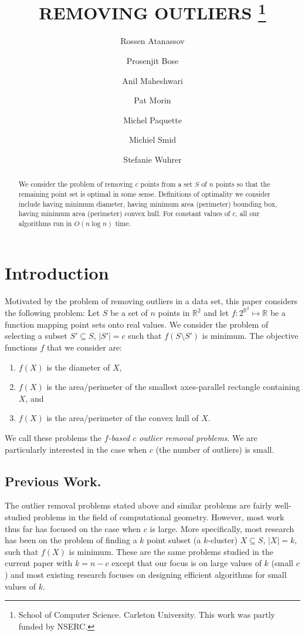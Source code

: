 \documentclass[lotsofwhite]{patmorin}
\title{
\MakeUppercase{Removing Outliers}%
\thanks{School of Computer Science. Carleton University. This work was partly funded by NSERC.}}
\author{Rossen Atanassov \and
	Prosenjit Bose \and
	Anil Maheshwari \and
	Pat Morin \and
	Michel Paquette \and
	Michiel Smid \and
	Stefanie Wuhrer
}
\date{}
\begin{document}
\maketitle

\begin{abstract}
We consider the problem of removing $c$ points from a set $S$ of $n$
points so that the remaining point set is optimal in some sense.
Definitions of optimality we consider include having minimum diameter,
having minimum area (perimeter) bounding box, having minimum area
(perimeter) convex hull.  For constant values of $c$, all our
algorithms run in $O(n\log n)$ time.
\end{abstract}

\section{Introduction}

Motivated by the problem of removing outliers in a data set, this
paper considers the following problem: Let $S$ be a set of $n$ points
in $\mathbb{R}^2$ and let $f:2^{\mathbb{R}^2}\mapsto \mathbb{R}$ be a
function mapping point sets onto real values.  We consider the problem
of selecting a subset $S'\subseteq S$, $|S'|=c$ such that
$f(S\setminus S')$ is minimum.  The objective functions $f$ that we
consider are:
\begin{enumerate}
\item $f(X)$ is the diameter of $X$,
\item $f(X)$ is the area/perimeter of the smallest axes-parallel
rectangle containing $X$, and
\item $f(X)$ is the area/perimeter of the convex hull of $X$.
\end{enumerate}  

We call these problems the \emph{$f$-based $c$ outlier removal problems}.
We are particularly interested in the case when $c$ (the number of
outliers) is small.

\subsection{Previous Work.} 

The outlier removal problems stated above and similar problems are
fairly well-studied problems in the field of computational geometry.
However, most work thus far has focused on the case when $c$ is large.
More specifically, most research has been on the problem of finding a
$k$ point subset (a $k$-cluster) $X\subseteq S$, $|X|=k$, such that
$f(X)$ is minimum. These are the same problems studied in the current
paper with $k=n-c$ except that our focus is on large values of $k$
(small $c$) and most existing research focuses on designing efficient
algorithms for small values of $k$.
\end{document}
